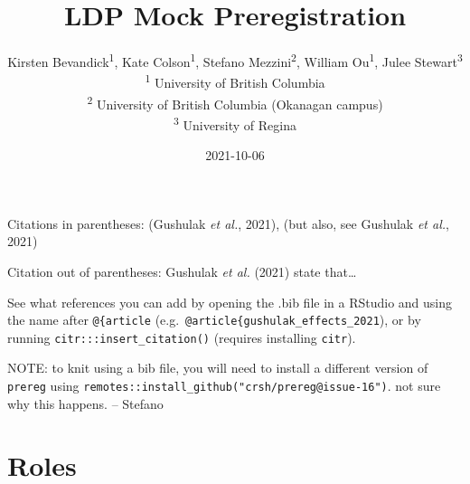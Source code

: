 \documentclass[]{article}
\title{LDP Mock Preregistration}
\author{
          Kirsten Bevandick\textsuperscript{1},
          Kate Colson\textsuperscript{1},
          Stefano Mezzini\textsuperscript{2},
          William Ou\textsuperscript{1},
          Julee Stewart\textsuperscript{3}          \\ \vspace{0.5cm}
              \textsuperscript{1} University of British Columbia\\
              \textsuperscript{2} University of British Columbia
(Okanagan campus)\\
              \textsuperscript{3} University of Regina      }
\date{2021-10-06}
\newcounter{question}
\begin{document}
\maketitle
\vspace{2pc}


\newcommand\Question[2]{%
   \leavevmode\par
   \stepcounter{question}
   \noindent
   \textbf{\thequestion. #1}. #2\par}

\newcommand\Answer[1]{%
    \noindent
    \textit{Registered response}: #1\par}
    
Citations in parentheses: (Gushulak \emph{et al.}, 2021), (but also, see
Gushulak \emph{et al.}, 2021)

Citation out of parentheses: Gushulak \emph{et al.} (2021) state
that\ldots{}

See what references you can add by opening the .bib file in a RStudio
and using the name after \texttt{@\{article}
(e.g.~\texttt{@article\{gushulak\_effects\_2021}), or by running
\texttt{citr:::insert\_citation()} (requires installing \texttt{citr}).

NOTE: to knit using a bib file, you will need to install a different
version of \texttt{prereg} using
\texttt{remotes::install\_github("crsh/prereg@issue-16")}. not sure why
this happens. -- Stefano

\hypertarget{roles}{%
\section{Roles}\label{roles}}
\end{document}
